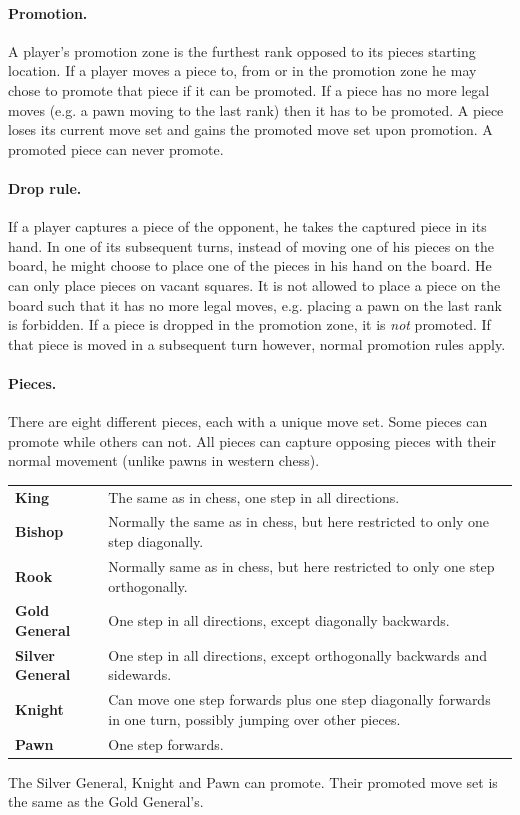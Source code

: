 \documentclass[a4paper, 11pt]{article}
\begin{document}
{\paragraph{Promotion.}  A player's promotion zone is the furthest rank opposed to its pieces starting location. 
If a player moves a piece to, from or in the promotion zone he may chose to promote that piece if it can be promoted. If a piece has no more legal moves
(e.g. a pawn moving to the last rank) then it has to be promoted. A piece loses its current move set and gains the promoted move set upon promotion. A promoted piece can never
promote.

\paragraph{Drop rule.} If a player captures a piece of the opponent, he takes the captured piece in its hand. In one of its subsequent turns, instead of moving one of his
pieces on the board, he might choose to place one of the pieces in his hand on the board. He can only place pieces on vacant squares. It is not allowed to place a piece
on the board such that it has no more legal moves, e.g. placing a pawn on the last rank is forbidden. If a piece is dropped in the promotion zone, it is \emph{not} promoted.
If that piece is moved in a subsequent turn however, normal promotion rules apply.

\paragraph{Pieces.} There are eight different pieces, each with a unique move set. Some pieces can promote while others can not. All pieces can capture opposing pieces with their normal movement
(unlike pawns in western chess).\\
\begin{tabularx}{\textwidth}{l X}
\textbf{King} & The same as in chess, one step in all directions.\\
\textbf{Bishop} & Normally the same as in chess, but here restricted to only one step diagonally.\\
\textbf{Rook} & Normally same as in chess, but here restricted to only one step orthogonally.\\
\textbf{Gold General} & One step in all directions, except diagonally backwards.\\
\textbf{Silver General} & One step in all directions, except orthogonally backwards and sidewards.\\
\textbf{Knight} & Can move one step forwards plus one step diagonally forwards in one turn, possibly jumping over other pieces.\\
\textbf{Pawn} & One step forwards.\\
\end{tabularx}
The Silver General, Knight and Pawn can promote. Their promoted move set is the same as the Gold General's.

}
\end{document}
